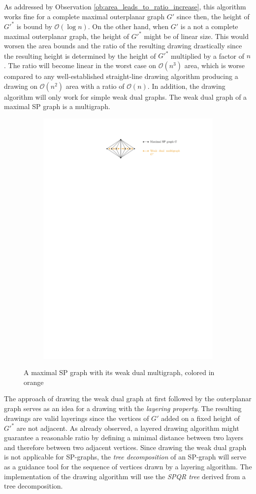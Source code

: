 As addressed by Observation \ref{ob:area_leads_to_ratio_increase}, this algorithm works fine for a complete maximal outerplanar graph $G'$ since then, the height of $G'^*$ is bound by $\mathcal{O}(\log n)$. On the other hand, when $G'$ is a not a complete maximal outerplanar graph, the height of $G'^*$ might be of linear size. This would worsen the area bounds and the ratio of the resulting drawing drastically since the resulting height is determined by the height of $G'^*$ multiplied by a factor of $n$. The ratio will become linear in the worst case on $\mathcal{O}(n^3)$ area, which is worse compared to any well-established straight-line drawing algorithm producing a drawing on $\mathcal{O}(n^2)$ area with a ratio of $\mathcal{O}(n)$. In addition, the drawing algorithm will only work for simple weak dual graphs. The weak dual graph of a maximal SP graph is a multigraph.
	\begin{figure}[H]
	\centering
	\begin{subfigure}{\textwidth}
		\centering
		\includegraphics[page=1,width=0.6\linewidth]{graphics/maximal_sp_weak_dual.pdf}
	\end{subfigure}
	\caption{A maximal SP graph with its weak dual multigraph, colored in orange}
\end{figure}
The approach of drawing the weak dual graph at first followed by the outerplanar graph serves as an idea for a drawing with the \emph{layering property}. The resulting drawings are valid layerings since the vertices of $G'$ added on a fixed height of $G'^*$ are not adjacent. As already observed, a layered drawing algorithm might guarantee a reasonable ratio by defining a minimal distance between two layers and therefore between two adjacent vertices. Since drawing the weak dual graph is not applicable for SP-graphs, the \emph{tree decomposition} of an SP-graph will serve as a guidance tool for the sequence of vertices drawn by a layering algorithm. The implementation of the drawing algorithm will use the \emph{SPQR tree} derived from a tree decomposition.\\\\

